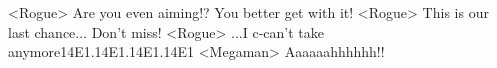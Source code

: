 <Rogue> Are you even aiming!? You better get with it! 
<Rogue> This is our last chance... Don't miss! 
<Rogue> ...I c-can't take anymore{14}{E1}.{14}{E1}.{14}{E1}.{14}{E1} 
<Megaman> Aaaaaahhhhhh!! 
